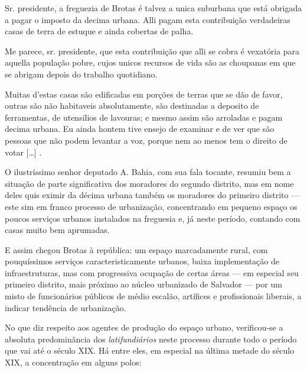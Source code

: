 \begin{citacao}
Sr. presidente, a freguezia de Brotas é talvez a unica suburbana que está obrigada a pagar o imposto da decima urbana. Alli pagam esta contribuição verdadeiras casas de terra de estuque e ainda cobertas de palha.

Me parece, sr. presidente, que esta contribuição que alli se cobra é vexatória para aquella população pobre, cujos unicos recursos de vida são as choupanas em que se abrigam depois do trabalho quotidiano.

Muitas d'estas casas são edificadas em porções de terras que se dão de favor, outras são não habitaveis absolutamente, são destinadas a deposito de ferramentas, de utensilios de lavouras; e mesmo assim são arroladas e pagam decima urbana. Eu ainda hontem tive ensejo de examinar e de ver que são pessoas que não podem levantar a voz, porque nem ao menos tem o direito de votar [\dots] \cite[p.~335]{bahia_assembleia_1887}.
\end{citacao}

O ilustríssimo senhor deputado A. Bahia, com sua fala tocante, resumiu bem a situação de parte significativa dos moradores do segundo distrito, mas em nome deles quis eximir da décima urbana também os moradores do primeiro distrito --- este sim em franco processo de urbanização, concentrando em pequeno espaço os poucos serviços urbanos instalados na freguesia  e, já neste período, contando com casas muito bem aprumadas.

E assim chegou Brotas à república: um espaço marcadamente rural, com pouquíssimos serviços caracteristicamente urbanos, baixa implementação de infraestruturas, mas com progressiva ocupação de certas áreas --- em especial seu primeiro distrito, mais próximo ao núcleo urbanizado de Salvador --- por um misto de funcionários públicos de médio escalão, artífices e profissionais liberais, a indicar tendência de urbanização. 

No que diz respeito aos agentes de produção do espaço urbano, verificou-se a absoluta predominância dos \textit{latifundiários} neste processo durante todo o período que vai até o século XIX. Há entre eles, em especial na última metade do século XIX, a concentração em alguns polos: 

